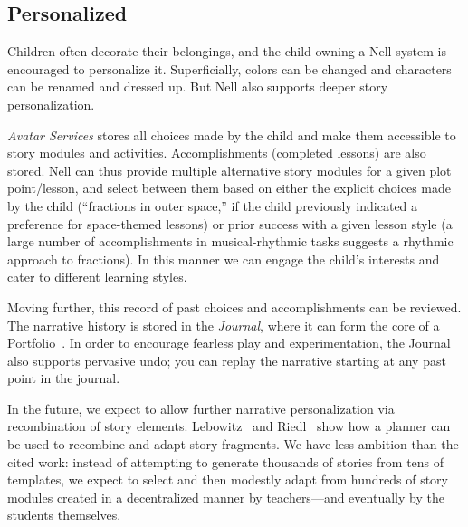 \documentclass[preprint]{sig-alternate}
\begin{document}

\subsection{Personalized}



Children often decorate their belongings, and the
child owning a Nell system is encouraged to personalize it.
Superficially, colors can be changed and characters can be renamed and
dressed up.  But Nell also supports deeper story personalization.

\textit{Avatar Services} stores all choices made by the child and make them
accessible to story modules and activities.  Accomplishments
(completed lessons) are also stored.  Nell can thus provide multiple
alternative story modules for a given plot point/lesson, and select
between them based on either the explicit choices made by the child
(``fractions in outer space,'' if the child previously indicated a
preference for space-themed lessons) or prior success with a given
lesson style (a large number of accomplishments in musical-rhythmic
tasks suggests a rhythmic approach to fractions).  In this manner we
can engage the child's interests and cater to different learning
styles.%

Moving further, this record of past choices and accomplishments can be
reviewed.  The narrative history is stored in the \textit{Journal},
where it can form the core of a Portfolio~\cite{stefanakis:portfolios}.
In order to encourage fearless play and experimentation, the Journal
also supports pervasive undo; you can replay the narrative starting at
any past point in the journal.

In the future, we expect to allow further narrative personalization
via recombination of story elements.
Lebowitz~\cite{lebowitz:universe85} and Riedl~\cite{riedl:planning}
show how a planner can be used to recombine and adapt story fragments.
We have less ambition than the cited work: instead of
attempting to generate thousands of stories from tens of templates, we
expect to select and then modestly adapt from hundreds of story
modules created in a decentralized manner by teachers---and eventually
by the students themselves.
\end{document}
